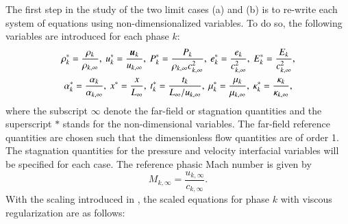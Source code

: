 \documentclass[preprint,10pt]{elsarticle}
\begin{document}
%
The first step in the study of the two limit cases (a) and (b) is to re-write each system of equations using non-dimensionalized 
variables. To do so, the following variables are introduced for each phase $k$:
%
\begin{multline}
\label{eq:norm_param}
\rho_k^*   = \frac{\rho_k}{\rho_{k,\infty}}           ,\
u_k^*      = \frac{\boldsymbol u_k}{u_{k,\infty}}                 ,\
P_k^*      = \frac{P_k}{\rho_{k,\infty} c^2_{k,\infty}}   ,\
e_k^*      = \frac{e_k}{c^2_{k,\infty} }              , \
E_k^*      = \frac{E_k}{c^2_{k,\infty} }              , \\
\alpha_k^*      = \frac{\alpha_k}{\alpha_{k,\infty} }              , \
x^* = \frac{x}{L_\infty}                      ,\
t_k^* = \frac{t_k}{L_\infty / u_{k,\infty}}           ,\
\mu_k^*    = \frac{\mu_k}{\mu_{k,\infty}}             ,\
\kappa_k^* = \frac{\kappa_k}{\kappa_{k,\infty}}       ,\\
\end{multline}
%
where  the subscript $\infty$ denote the far-field or stagnation quantities and the superscript $*$ stands for the non-dimensional variables.
The far-field reference quantities are chosen such that the dimensionless flow quantities are of order 1. The stagnation quantities for 
the pressure and velocity interfacial variables will be specified for each case. The reference phasic Mach number is given by
%
\begin{equation}
M_{k,\infty} = \frac{u_{k,\infty}}{c_{k,\infty}}.
\end{equation}
%
With the scaling introduced in \eqt{eq:norm_param}, the scaled equations for phase $k$ with viscous regularization are as follows:
\end{document}
